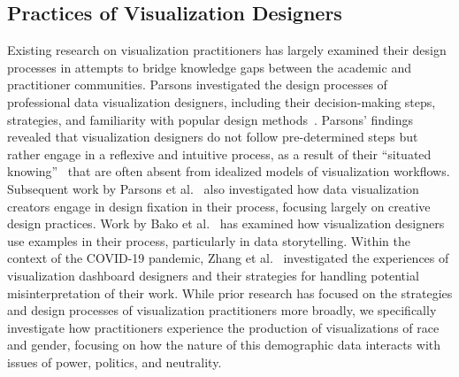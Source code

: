 \subsection{Practices of Visualization Designers}
Existing research on visualization practitioners has largely examined their design processes in attempts to bridge knowledge gaps between the academic and practitioner communities. Parsons investigated the design processes of professional data visualization designers, including their decision-making steps, strategies, and familiarity with popular design methods~\cite{parsons2021understanding}. Parsons' findings revealed that visualization designers do not follow pre-determined steps but rather engage in a reflexive and intuitive process, as a result of their ``situated knowing''~\cite{parsons2021understanding} that are often absent from idealized models of visualization workflows. Subsequent work by Parsons et al.~\cite{parsons2021fixation} also investigated how data visualization creators engage in design fixation in their process, focusing largely on creative design practices. Work by Bako et al.~\cite{bako2022understanding} has examined how visualization designers use examples in their process, particularly in data storytelling. Within the context of the COVID-19 pandemic, Zhang et al.~\cite{zhang2022visualization} investigated the experiences of visualization dashboard designers and their strategies for handling potential misinterpretation of their work. While prior research has focused on the strategies and design processes of visualization practitioners more broadly, we specifically investigate how practitioners experience the production of visualizations of race and gender, focusing on how the nature of this demographic data interacts with issues of power, politics, and neutrality.
%
